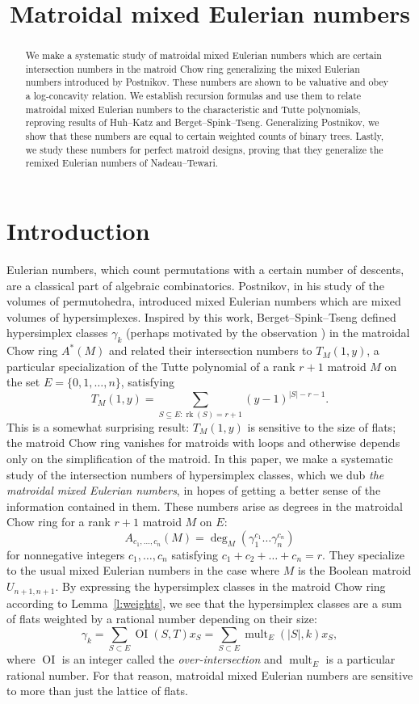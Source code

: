 \documentclass[ALCO,published]{cedram}
\title{Matroidal mixed Eulerian numbers}
\author[\initial{E.} Katz]{\firstname{Eric} \lastname{Katz}}
\author[\initial{M.} Kutler]{\firstname{Max} \lastname{Kutler}}
\numberwithin{equation}{section}
\numberwithin{figure}{section}
\DeclareMathOperator{\OI}{OI}
\DeclareMathOperator{\mult}{mult}
\DeclareMathOperator{\rk}{rk}
\begin{document}
\begin{abstract}
We make a systematic study of matroidal mixed Eulerian numbers which are certain intersection numbers in the matroid Chow ring generalizing the mixed Eulerian numbers introduced by Postnikov. These numbers are shown to be valuative and obey a log-concavity relation. We  establish recursion formulas and use them to relate matroidal mixed 
Eulerian numbers to the characteristic and Tutte polynomials, reproving results of Huh--Katz and Berget--Spink--Tseng. Generalizing Postnikov, we show that these numbers are equal to certain weighted counts of binary trees. Lastly, we study these numbers for perfect matroid designs, proving that they generalize the remixed Eulerian numbers of Nadeau--Tewari.
\end{abstract}

\maketitle


\section{Introduction}

Eulerian numbers, which count permutations with a certain number of descents, are a classical part of algebraic combinatorics. Postnikov, in his study of the volumes of permutohedra, introduced mixed Eulerian numbers which are mixed volumes of hypersimplexes. 
Inspired by this work, Berget--Spink--Tseng \cite{BST} defined hypersimplex classes $\gamma_k$ (perhaps motivated by the observation \cite[Remark~3.6]{Huh:tropicalgeometry}) in the matroidal Chow ring $A^*(M)$ and related their intersection numbers to $T_M(1,y)$, a particular specialization of the Tutte polynomial of a rank $r+1$ matroid $M$ on the set $E=\{0,1,\dots,n\}$, satisfying
\[T_M(1,y)=\sum_{S\subseteq E:\rk(S)=r+1} (y-1)^{|S|-r-1}.\]
This is a somewhat surprising result: $T_M(1,y)$ is sensitive to the size of flats; the matroid Chow ring vanishes for matroids with loops and otherwise depends only on the simplification of the matroid. In this paper, we make a systematic study of the intersection numbers of hypersimplex classes, which we dub {\em the matroidal mixed Eulerian numbers}, in hopes of getting a better sense of the information contained in them. These numbers arise as degrees in the matroidal Chow ring  for a rank $r+1$ matroid $M$ on $E$:
\[A_{c_1,\dots,c_n}(M)=\deg_M(\gamma_1^{c_1}\dots\gamma_n^{c_n})\]
for nonnegative integers $c_1,\dots,c_n$ satisfying $c_1+c_2+\dots+c_n=r$.
They specialize to the usual mixed Eulerian numbers in the case where $M$ is the Boolean matroid $U_{n+1,n+1}$.
By expressing the hypersimplex classes in the matroid Chow ring according to Lemma~\ref{l:weights}, we see that the hypersimplex classes are a sum of flats weighted by a rational number depending on their size:
\[\gamma_k=\sum_{S\subset E} \OI(S,T)x_S=\sum_{S\subset E} \mult_{E}(|S|,k) x_S,\]
where $\OI$ is an integer called the {\em over-intersection} and $\mult_{E}$ is a particular rational number.
For that reason, matroidal mixed Eulerian numbers are sensitive to more than just the lattice of flats.
\end{document}

